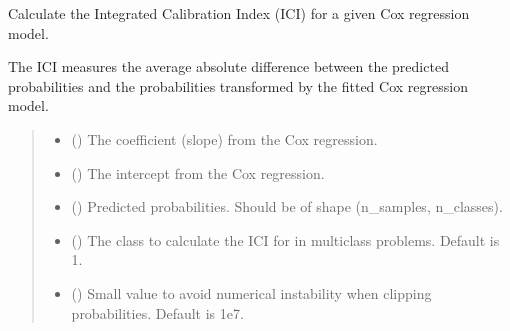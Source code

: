 \documentclass[letterpaper,10pt,english]{sphinxmanual}
\begin{document}
\begin{fulllineitems}
\label{\detokenize{calzone:calzone.metrics.cal_ICI_cox}}
\pysigstartsignatures
{}
\pysigstopsignatures
\sphinxAtStartPar
Calculate the Integrated Calibration Index (ICI) for a given Cox regression model.

\sphinxAtStartPar
The ICI measures the average absolute difference between the predicted probabilities
and the probabilities transformed by the fitted Cox regression model.
\begin{quote}\begin{description}
\begin{itemize}
\item {} 
\sphinxAtStartPar
{} () \textendash{} The coefficient (slope) from the Cox regression.

\item {} 
\sphinxAtStartPar
{} () \textendash{} The intercept from the Cox regression.

\item {} 
\sphinxAtStartPar
{} () \textendash{} Predicted probabilities. Should be of shape (n\_samples, n\_classes).

\item {} 
\sphinxAtStartPar
{} () \textendash{} The class to calculate the ICI for in multi\sphinxhyphen{}class problems. Default is 1.

\item {} 
\sphinxAtStartPar
{} () \textendash{} Small value to avoid numerical instability when clipping probabilities. Default is 1e\sphinxhyphen{}7.


\end{itemize}
\end{description}
\end{quote}
\end{fulllineitems}
\end{document}
